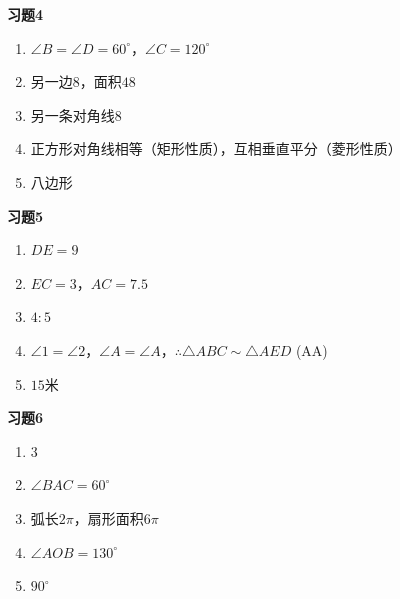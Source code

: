\documentclass[a4paper,12pt]{ctexart}
\begin{document}
\textbf{习题4}
\begin{enumerate}
\item $\angle B=\angle D=60^\circ$，$\angle C=120^\circ$
\item 另一边$8$，面积$48$
\item 另一条对角线$8$
\item 正方形对角线相等（矩形性质），互相垂直平分（菱形性质）
\item 八边形
\end{enumerate}

\textbf{习题5}
\begin{enumerate}
\item $DE=9$
\item $EC=3$，$AC=7.5$
\item $4:5$
\item $\angle1=\angle2$，$\angle A=\angle A$，$\therefore\triangle ABC\sim\triangle AED$ (AA)
\item $15$米
\end{enumerate}

\textbf{习题6}
\begin{enumerate}
\item $3$
\item $\angle BAC=60^\circ$
\item 弧长$2\pi$，扇形面积$6\pi$
\item $\angle AOB=130^\circ$
\item $90^\circ$
\end{enumerate}
\end{document}
